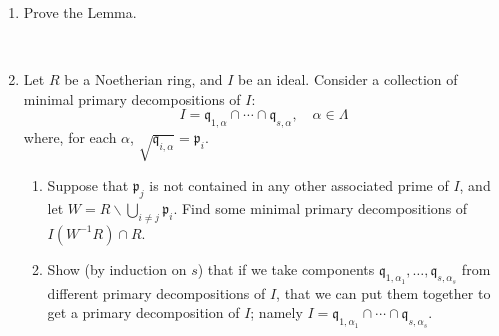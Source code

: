 \documentclass[12pt]{amsart}
\newcommand{\p}{\mathfrak{p}}
\newcommand{\q}{\mathfrak{q}}
\renewcommand{\1}{\mathbbm{1}}
\newcommand\itemB{\stepcounter{enumi}\item[(\theenumi)]}
\begin{document}
\begin{enumerate}
\itemB Prove the Lemma.

\

\itemB Let $R$ be a Noetherian ring, and $I$ be an ideal. Consider a collection of minimal primary decompositions of $I$:
\[ I = \q_{1,\alpha} \cap \cdots \cap \q_{s,\alpha}, \quad \alpha\in \Lambda\]
where, for each $\alpha$,  $\sqrt{\q_{i,\alpha}} = \p_i$.
\begin{enumerate}
	\item Suppose that $\p_j$ is not contained in any other associated prime of $I$, and let ${W=R\smallsetminus \bigcup_{i\neq j} \p_i}$. Find some minimal primary decompositions of $I(W^{-1} R) \cap R$.
	\item Show (by induction on $s$) that if we take components $\q_{1,\alpha_1} ,\dots, \q_{s,\alpha_s}$ from different primary decompositions of $I$, that we can put them together to get a primary decomposition of $I$; namely $I=\q_{1,\alpha_1} \cap \cdots \cap \q_{s,\alpha_s}$.
\end{enumerate}



\end{enumerate}
\end{document}
